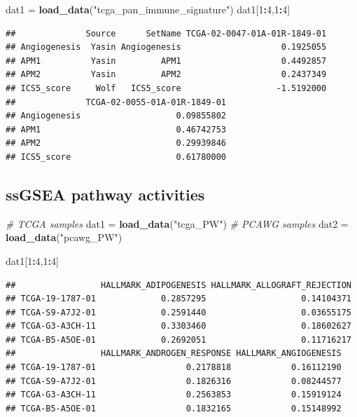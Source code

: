 \documentclass[
]{book}
\newenvironment{Shaded}{\begin{snugshade}}{\end{snugshade}}
\newcommand{\CommentTok}[1]{\textcolor[rgb]{0.56,0.35,0.01}{\textit{#1}}}
\newcommand{\DecValTok}[1]{\textcolor[rgb]{0.00,0.00,0.81}{#1}}
\newcommand{\FunctionTok}[1]{\textcolor[rgb]{0.13,0.29,0.53}{\textbf{#1}}}
\newcommand{\NormalTok}[1]{#1}
\newcommand{\OtherTok}[1]{\textcolor[rgb]{0.56,0.35,0.01}{#1}}
\newcommand{\SpecialCharTok}[1]{\textcolor[rgb]{0.81,0.36,0.00}{\textbf{#1}}}
\newcommand{\StringTok}[1]{\textcolor[rgb]{0.31,0.60,0.02}{#1}}
\begin{document}
\begin{Shaded}
\begin{Highlighting}[]
\NormalTok{dat1 }\OtherTok{=} \FunctionTok{load\_data}\NormalTok{(}\StringTok{"tcga\_pan\_immune\_signature"}\NormalTok{)}
\NormalTok{dat1[}\DecValTok{1}\SpecialCharTok{:}\DecValTok{4}\NormalTok{,}\DecValTok{1}\SpecialCharTok{:}\DecValTok{4}\NormalTok{]}
\end{Highlighting}
\end{Shaded}

\begin{verbatim}
##              Source      SetName TCGA-02-0047-01A-01R-1849-01
## Angiogenesis  Yasin Angiogenesis                    0.1925055
## APM1          Yasin         APM1                    0.4492857
## APM2          Yasin         APM2                    0.2437349
## ICS5_score     Wolf   ICS5_score                   -1.5192000
##              TCGA-02-0055-01A-01R-1849-01
## Angiogenesis                   0.09855802
## APM1                           0.46742753
## APM2                           0.29939846
## ICS5_score                     0.61780000
\end{verbatim}

\subsection{ssGSEA pathway activities}\label{ssgsea-pathway-activities}

\begin{Shaded}
\begin{Highlighting}[]
\CommentTok{\# TCGA samples}
\NormalTok{dat1 }\OtherTok{=} \FunctionTok{load\_data}\NormalTok{(}\StringTok{"tcga\_PW"}\NormalTok{)}
\CommentTok{\# PCAWG samples}
\NormalTok{dat2 }\OtherTok{=} \FunctionTok{load\_data}\NormalTok{(}\StringTok{"pcawg\_PW"}\NormalTok{)}

\NormalTok{dat1[}\DecValTok{1}\SpecialCharTok{:}\DecValTok{4}\NormalTok{,}\DecValTok{1}\SpecialCharTok{:}\DecValTok{4}\NormalTok{]}
\end{Highlighting}
\end{Shaded}

\begin{verbatim}
##                 HALLMARK_ADIPOGENESIS HALLMARK_ALLOGRAFT_REJECTION
## TCGA-19-1787-01             0.2857295                   0.14104371
## TCGA-S9-A7J2-01             0.2591440                   0.03655175
## TCGA-G3-A3CH-11             0.3303460                   0.18602627
## TCGA-B5-A5OE-01             0.2692051                   0.11716217
##                 HALLMARK_ANDROGEN_RESPONSE HALLMARK_ANGIOGENESIS
## TCGA-19-1787-01                  0.2178818            0.16112190
## TCGA-S9-A7J2-01                  0.1826316            0.08244577
## TCGA-G3-A3CH-11                  0.2563853            0.15919124
## TCGA-B5-A5OE-01                  0.1832165            0.15148992
\end{verbatim}
\end{document}

